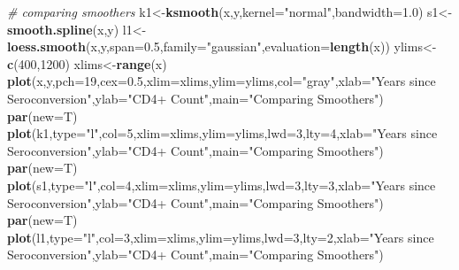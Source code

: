 \documentclass[]{article}
\newenvironment{Shaded}{\begin{snugshade}}{\end{snugshade}}
\newcommand{\CommentTok}[1]{\textcolor[rgb]{0.56,0.35,0.01}{\textit{#1}}}
\newcommand{\DataTypeTok}[1]{\textcolor[rgb]{0.13,0.29,0.53}{#1}}
\newcommand{\DecValTok}[1]{\textcolor[rgb]{0.00,0.00,0.81}{#1}}
\newcommand{\FloatTok}[1]{\textcolor[rgb]{0.00,0.00,0.81}{#1}}
\newcommand{\KeywordTok}[1]{\textcolor[rgb]{0.13,0.29,0.53}{\textbf{#1}}}
\newcommand{\NormalTok}[1]{#1}
\newcommand{\StringTok}[1]{\textcolor[rgb]{0.31,0.60,0.02}{#1}}
\begin{document}
\begin{Shaded}
\begin{Highlighting}[]
\CommentTok{# comparing smoothers}
\NormalTok{k1<-}\KeywordTok{ksmooth}\NormalTok{(x,y,}\DataTypeTok{kernel=}\StringTok{"normal"}\NormalTok{,}\DataTypeTok{bandwidth=}\FloatTok{1.0}\NormalTok{)}
\NormalTok{s1<-}\KeywordTok{smooth.spline}\NormalTok{(x,y)}
\NormalTok{l1<-}\KeywordTok{loess.smooth}\NormalTok{(x,y,}\DataTypeTok{span=}\FloatTok{0.5}\NormalTok{,}\DataTypeTok{family=}\StringTok{"gaussian"}\NormalTok{,}\DataTypeTok{evaluation=}\KeywordTok{length}\NormalTok{(x))}
\NormalTok{ylims<-}\KeywordTok{c}\NormalTok{(}\DecValTok{400}\NormalTok{,}\DecValTok{1200}\NormalTok{)}
\NormalTok{xlims<-}\KeywordTok{range}\NormalTok{(x)}
\KeywordTok{plot}\NormalTok{(x,y,}\DataTypeTok{pch=}\DecValTok{19}\NormalTok{,}\DataTypeTok{cex=}\FloatTok{0.5}\NormalTok{,}\DataTypeTok{xlim=}\NormalTok{xlims,}\DataTypeTok{ylim=}\NormalTok{ylims,}\DataTypeTok{col=}\StringTok{"gray"}\NormalTok{,}\DataTypeTok{xlab=}\StringTok{"Years since Seroconversion"}\NormalTok{,}\DataTypeTok{ylab=}\StringTok{"CD4+ Count"}\NormalTok{,}\DataTypeTok{main=}\StringTok{"Comparing Smoothers"}\NormalTok{)}
\KeywordTok{par}\NormalTok{(}\DataTypeTok{new=}\NormalTok{T)}
\KeywordTok{plot}\NormalTok{(k1,}\DataTypeTok{type=}\StringTok{"l"}\NormalTok{,}\DataTypeTok{col=}\DecValTok{5}\NormalTok{,}\DataTypeTok{xlim=}\NormalTok{xlims,}\DataTypeTok{ylim=}\NormalTok{ylims,}\DataTypeTok{lwd=}\DecValTok{3}\NormalTok{,}\DataTypeTok{lty=}\DecValTok{4}\NormalTok{,}\DataTypeTok{xlab=}\StringTok{"Years since Seroconversion"}\NormalTok{,}\DataTypeTok{ylab=}\StringTok{"CD4+ Count"}\NormalTok{,}\DataTypeTok{main=}\StringTok{"Comparing Smoothers"}\NormalTok{)}
\KeywordTok{par}\NormalTok{(}\DataTypeTok{new=}\NormalTok{T)}
\KeywordTok{plot}\NormalTok{(s1,}\DataTypeTok{type=}\StringTok{"l"}\NormalTok{,}\DataTypeTok{col=}\DecValTok{4}\NormalTok{,}\DataTypeTok{xlim=}\NormalTok{xlims,}\DataTypeTok{ylim=}\NormalTok{ylims,}\DataTypeTok{lwd=}\DecValTok{3}\NormalTok{,}\DataTypeTok{lty=}\DecValTok{3}\NormalTok{,}\DataTypeTok{xlab=}\StringTok{"Years since Seroconversion"}\NormalTok{,}\DataTypeTok{ylab=}\StringTok{"CD4+ Count"}\NormalTok{,}\DataTypeTok{main=}\StringTok{"Comparing Smoothers"}\NormalTok{)}
\KeywordTok{par}\NormalTok{(}\DataTypeTok{new=}\NormalTok{T)}
\KeywordTok{plot}\NormalTok{(l1,}\DataTypeTok{type=}\StringTok{"l"}\NormalTok{,}\DataTypeTok{col=}\DecValTok{3}\NormalTok{,}\DataTypeTok{xlim=}\NormalTok{xlims,}\DataTypeTok{ylim=}\NormalTok{ylims,}\DataTypeTok{lwd=}\DecValTok{3}\NormalTok{,}\DataTypeTok{lty=}\DecValTok{2}\NormalTok{,}\DataTypeTok{xlab=}\StringTok{"Years since Seroconversion"}\NormalTok{,}\DataTypeTok{ylab=}\StringTok{"CD4+ Count"}\NormalTok{,}\DataTypeTok{main=}\StringTok{"Comparing Smoothers"}\NormalTok{)}

\end{Highlighting}
\end{Shaded}
\end{document}
